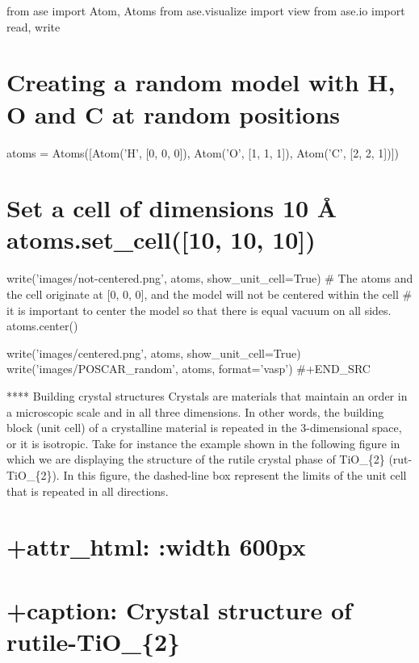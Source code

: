 \documentclass[11pt]{article}
\begin{document}
from ase import Atom, Atoms from ase.visualize import view from ase.io
import read, write

\section{Creating a random model with H, O and C at random
positions}\label{creating-a-random-model-with-h-o-and-c-at-random-positions}

atoms = Atoms({[}Atom('H', {[}0, 0, 0{]}), Atom('O', {[}1, 1, 1{]}),
Atom('C', {[}2, 2, 1{]}){]})

\section{\texorpdfstring{Set a cell of dimensions 10 \AA
atoms.set\_cell({[}10, 10,
10{]})}{Set a cell of dimensions 10 atoms.set\_cell({[}10, 10, 10{]})}}\label{set-a-cell-of-dimensions-10-atoms.set_cell10-10-10}

write('images/not-centered.png', atoms, show\_unit\_cell=True) \# The
atoms and the cell originate at {[}0, 0, 0{]}, and the model will not be
centered within the cell \# it is important to center the model so that
there is equal vacuum on all sides. atoms.center()

write('images/centered.png', atoms, show\_unit\_cell=True)
write('images/POSCAR\_random', atoms, format='vasp') \#+END\_SRC

**** Building crystal structures Crystals are materials that maintain an
order in a microscopic scale and in all three dimensions. In other
words, the building block (unit cell) of a crystalline material is
repeated in the 3-dimensional space, or it is isotropic. Take for
instance the example shown in the following figure in which we are
displaying the structure of the rutile crystal phase of TiO\_\{2\}
(rut-TiO\_\{2\}). In this figure, the dashed-line box represent the
limits of the unit cell that is repeated in all directions.

\section{+attr\_html: :width 600px}\label{attr_html-width-600px-1}

\section{+caption: Crystal structure of
rutile-TiO\_\{2\}}\label{caption-crystal-structure-of-rutile-tio_2}
\end{document}
